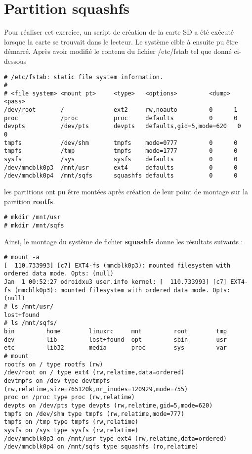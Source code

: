 \section{Partition squashfs}
Pour réaliser cet exercice, un script de création de la carte SD a été exécuté lorsque la carte \usd se trouvait dans le lecteur. Le système cible à ensuite pu être démarré. Après avoir modifié le contenu du fichier /etc/fstab tel que donné ci-dessous
\begin{lstlisting}
# /etc/fstab: static file system information.
#
# <file system> <mount pt>     <type>   <options>         <dump> <pass>
/dev/root       /              ext2     rw,noauto         0      1
proc            /proc          proc     defaults          0      0
devpts          /dev/pts       devpts   defaults,gid=5,mode=620   0      0
tmpfs           /dev/shm       tmpfs    mode=0777         0      0
tmpfs           /tmp           tmpfs    mode=1777         0      0
sysfs           /sys           sysfs    defaults          0      0
/dev/mmcblk0p3  /mnt/usr       ext4     defaults          0      0
/dev/mmcblk0p4  /mnt/sqfs      squashfs defaults          0      0
\end{lstlisting}

les partitions ont pu être montées après création de leur point de montage sur la partition \textbf{rootfs}.
\begin{lstlisting}
# mkdir /mnt/usr
# mkdir /mnt/sqfs
\end{lstlisting}

Ainsi, le montage du système de fichier \textbf{squashfs} donne les résultats suivants :
\begin{lstlisting}[style=Bash]
# mount -a
[  110.733993] [c7] EXT4-fs (mmcblk0p3): mounted filesystem with ordered data mode. Opts: (null)
Jan  1 00:52:27 odroidxu3 user.info kernel: [  110.733993] [c7] EXT4-fs (mmcblk0p3): mounted filesystem with ordered data mode. Opts: (null)
# ls /mnt/usr/
lost+found
# ls /mnt/sqfs/
bin         home        linuxrc     mnt         root        tmp
dev         lib         lost+found  opt         sbin        usr
etc         lib32       media       proc        sys         var
# mount
rootfs on / type rootfs (rw)
/dev/root on / type ext4 (rw,relatime,data=ordered)
devtmpfs on /dev type devtmpfs (rw,relatime,size=765120k,nr_inodes=120929,mode=755)
proc on /proc type proc (rw,relatime)
devpts on /dev/pts type devpts (rw,relatime,gid=5,mode=620)
tmpfs on /dev/shm type tmpfs (rw,relatime,mode=777)
tmpfs on /tmp type tmpfs (rw,relatime)
sysfs on /sys type sysfs (rw,relatime)
/dev/mmcblk0p3 on /mnt/usr type ext4 (rw,relatime,data=ordered)
/dev/mmcblk0p4 on /mnt/sqfs type squashfs (ro,relatime)
\end{lstlisting}


